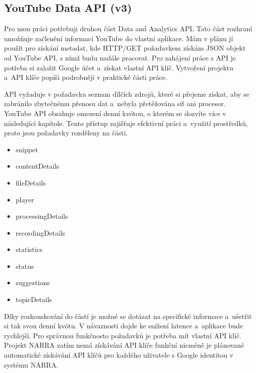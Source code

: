 \subsection{YouTube Data API (v3)}
\par Pro mou práci potřebuji druhou část Data and Analytics API\cite{apistart}\cite{apiv3}. Tato část rozhraní umožňuje začlenění informací YouTube do vlastní aplikace. Mám v plánu jí použít pro získání metadat, kde HTTP/GET požadavkem získám JSON objekt od YouTube API, s nímž budu nadále pracovat. Pro zahájení práce s API je potřeba si založit Google účet a~získat vlastní API klíč. Vytvoření projektu a~API klíče popíši podrobněji v praktické části práce.
\par 
\par API vyžaduje v požadavku seznam dílčích zdrojů, které si přejeme získat, aby se zabránilo zbytečnému přenosu dat a~nebyla přetěžována síť ani procesor. YouTube API obsahuje omezení denní kvótou, o kterém se dozvíte více v následující kapitole. Tento přístup zajišťuje efektivní práci a~využití prostředků, proto jsou požadavky rozděleny na části.
\begin{itemize} 
\item{snippet}
\item{contentDetails}
\item{fileDetails}
\item{player}
\item{processingDetails}
\item{recordingDetails}
\item{statistics}
\item{status}
\item{suggestions}
\item{topicDetails}
\end{itemize}
\par Díky rozkouskování do částí je možné se dotázat na specifické informace a~ušetřit si tak svou denní kvótu. V návaznosti dojde ke snížení latence a~aplikace bude rychlejší. Pro správnou funkčnosto požadavků je potřeba mít vlastní API klíč. Projekt NARRA zatím nemá získávání API klíče funkční nicméně je plánované automatické získávání API klíčů pro každého uživatele s Google identitou v systému NARRA.

